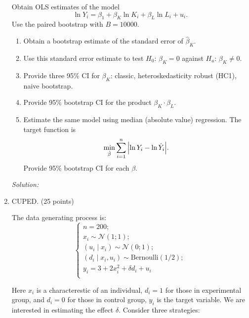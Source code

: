 \documentclass[12pt]{article}
\newcommand{\1}{\mathbbm{I}}
\begin{document}
\begin{enumerate}
Obtain OLS estimates of the model 
\[
\ln Y_i = \beta_1 + \beta_K \ln K_i + \beta_L \ln L_i  + u_i.
\] 
Use the paired bootstrap with $B = 10000$.

\begin{enumerate}
	\item Obtain a bootstrap estimate of the standard error of $\hat \beta_K$. 
	
	\item Use this standard error estimate to test $H_0$: $\beta_K = 0$ against $H_a$: $\beta_K \neq 0$.
	
	\item Provide three 95\% CI for $\beta_K$: classic, heteroskedasticity robust (HC1), naive bootstrap.
	
	\item Provide 95\% bootstrap CI for the product $\beta_K \cdot \beta_L$.
	
	\item Estimate the same model using median (absolute value) regression. 
	The target function is 
	\[
	\min_{\hat\beta} \sum_{i=1}^n \abs{\ln Y_i  - \ln \hat Y_i}.
	\]
	Provide 95\% bootstrap CI for each $\beta$. 

\end{enumerate}







\begin{teacher}
	
\textit{Solution:} 

	
\end{teacher}



\newpage
\item CUPED. (25 points)

The data generating process is:
\[
\begin{cases}
n = 200; \\
x_i \sim \mathcal{N}(1; 1); \\
(u_i\mid x_i) \sim \mathcal{N}(0; 1); \\
(d_i \mid x_i, u_i) \sim \mathrm{Bernoulli}(1/2); \\
y_i = 3 + 2 x_i^2 + \delta d_i + u_i \\
\end{cases}
\]

Here $x_i$ is a characterestic of an individual, $d_i = 1$ for those in experimental group, 
and $d_i=0$ for those in control group, $y_i$ is the target variable. 
We are interested in estimating the effect $\delta$. 
Consider three strategies:


\end{enumerate}
\end{document}
